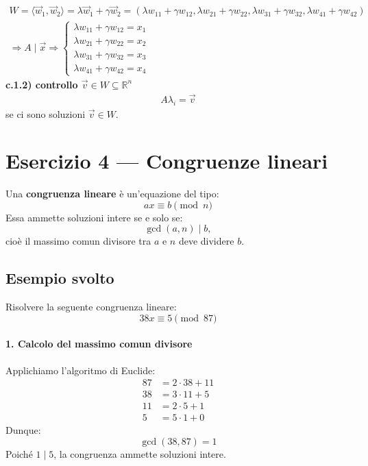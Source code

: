\documentclass[a4paper,12pt]{article}
\begin{document}
\begin{align*}
W = \langle \vec{w}_1, \vec{w}_2 \rangle 
= \lambda \vec{w}_1 + \gamma \vec{w}_2 
= (\lambda w_{11} + \gamma w_{12}, \lambda w_{21} + \gamma w_{22}, \lambda w_{31} + \gamma w_{32}, \lambda w_{41} + \gamma w_{42}) \\
\Rightarrow A \mid \vec{x} \Rightarrow \begin{cases}
\lambda w_{11} + \gamma w_{12} = x_1 \\
\lambda w_{21} + \gamma w_{22} = x_2 \\
\lambda w_{31} + \gamma w_{32} = x_3 \\
\lambda w_{41} + \gamma w_{42} = x_4
\end{cases}
\end{align*}
\textbf{c.1.2) controllo $\vec{v}\in W\subseteq \mathbb{R}^n$}
\begin{align*}
    A\lambda_i=\vec{v}
\end{align*}
se ci sono soluzioni $\vec{v} \in W$.
\pagebreak
\section*{Esercizio 4 — Congruenze lineari}

Una \textbf{congruenza lineare} è un'equazione del tipo:
\[
ax \equiv b \pmod{n}
\]
Essa ammette soluzioni intere se e solo se:
\[
\gcd(a, n) \mid b,
\]
cioè il massimo comun divisore tra \(a\) e \(n\) deve dividere \(b\).

\subsection*{Esempio svolto}

Risolvere la seguente congruenza lineare:
\[
38x \equiv 5 \pmod{87}
\]

\paragraph{1. Calcolo del massimo comun divisore}
Applichiamo l'algoritmo di Euclide:
\[
\begin{aligned}
87 &= 2 \cdot 38 + 11 \\
38 &= 3 \cdot 11 + 5 \\
11 &= 2 \cdot 5 + 1 \\
5 &= 5 \cdot \boxed{1} + 0
\end{aligned}
\]
Dunque:
\[
\gcd(38, 87) = 1
\]
Poiché \(1 \mid 5\), la congruenza ammette soluzioni intere.
\end{document}
